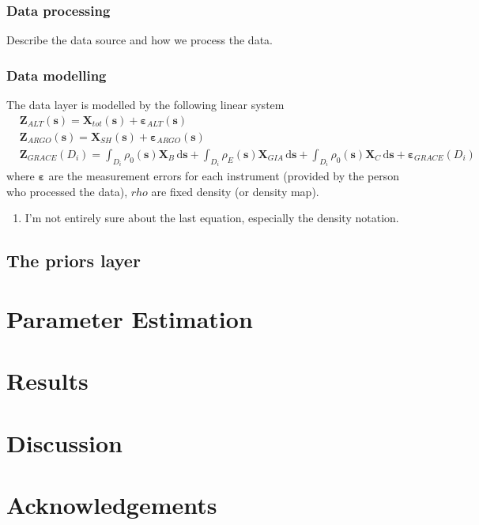 \documentclass[cmbright,fleqn,referee]{envauth}
\newcommand{\bX}{\bm{X}}
\newcommand{\bs}{\bm{s}}
\newcommand{\bZ}{\bm{Z}}
\newcommand{\ubd}{\,\bm{\mathrm{d}}}
\begin{document}
\subsubsection{Data processing}
Describe the data source and how we process the data.

\subsubsection{Data modelling}
The data layer is modelled by the following linear system
\begin{align}
&\bZ_{ALT}(\bs) = \bX_{tot}(\bs) + \bm{\varepsilon}_{ALT}(\bs) \\
&\bZ_{ARGO}(\bs) = \bX_{SH}(\bs) + \bm{\varepsilon}_{ARGO}(\bs)\\
&\bZ_{GRACE}(D_i) = \int_{D_i} \rho_0(\bs) \bX_{B} \ubd \bs + \int_{D_i} \rho_E(\bs) \bX_{GIA} \ubd \bs + \int_{D_i} \rho_0(\bs) \bX_{C} \ubd \bs + \bm{\varepsilon}_{GRACE}(D_i)
\end{align}
where $\bm{\varepsilon}$ are the measurement errors for each instrument (provided by the person who processed the data), $rho$ are fixed density (or density map).
\begin{enumerate}
\item I'm not entirely sure about the last equation, especially the density notation.
\end{enumerate}
\subsection{The priors layer}


\section{Parameter Estimation}
\label{s:estimate}



\section{Results}
\label{s:result}

\section{Discussion}
\label{s:discuss}

\section*{Acknowledgements}
\end{document}

